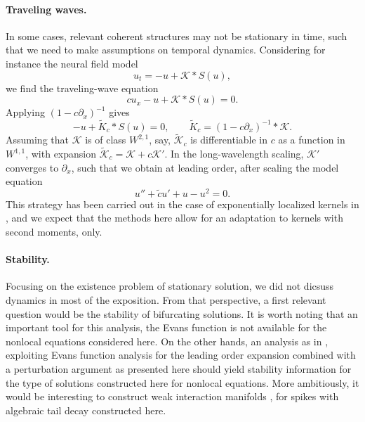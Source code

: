 \documentclass[10pt]{article}
\newcommand{\K}{\mathcal{K}}
\begin{document}
\paragraph{Traveling waves.} In some cases, relevant coherent structures may not be stationary in time, such that we need to make assumptions on temporal dynamics. Considering for instance the neural field model
\[
u_t=-u+\K*S(u),
\]
we find the traveling-wave equation 
\[
cu_x - u + \K*S(u)=0.
\]
Applying $(1-c\partial_x)^{-1}$ gives 
\[
-u+\tilde{K}_c*S(u)=0,\qquad \tilde{K}_c=(1-c\partial_x)^{-1}*\K.
\]
Assuming that $\K$ is of class $W^{2,1}$, say, $\tilde{\K}_c$ is differentiable in $c$ as a function in $W^{1,1}$, with expansion $\tilde{\K}_c=\K+c\K'$. In the long-wavelength scaling, $\K'$ converges to $\partial_x$, such that we obtain at leading order, after scaling  the model equation 
\[
u''+\tilde{c}u'+u-u^2=0.
\]
This strategy has been carried out in the case of exponentially localized kernels in \cite[\S 4.2]{FScmfd}, and we expect that the methods here allow for an adaptation to kernels with second moments, only. 


\paragraph{Stability.} Focusing on the existence problem of stationary solution, we did not dicsuss dynamics in most of the exposition. From that perspective, a first relevant question would be the stability of bifurcating solutions. It is worth noting that an important tool for this analysis, the Evans function \cite{evans,agj,sandtw} is not available for the nonlocal equations considered here. On the other hands, an analysis as in \cite{HS,HS2}, exploiting Evans function analysis for the leading order expansion combined with a perturbation argument as presented here should yield stability information for the type of solutions constructed here for nonlocal equations. More ambitiously, it would be interesting to construct weak interaction manifolds \cite{sandtw,bz,mz}, for spikes with algebraic tail decay constructed here. 
\end{document}
